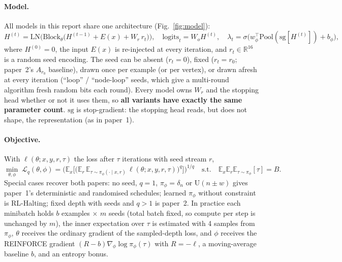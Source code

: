 \documentclass[10pt]{article}
\theoremstyle{definition}
\theoremstyle{remark}
\newcommand{\E}{\mathbb{E}}
\newcommand{\R}{\mathbb{R}}
\newcommand{\pistop}{\pi_\phi}
\newcommand{\Lq}{\mathcal{L}_q}
\begin{document}
\paragraph{Model.}
All models in this report share one architecture (Fig.~\ref{fig:model}):
\begin{equation}
H^{(t)}=\mathrm{LN}\Big(\mathrm{Block}_\theta\big(H^{(t-1)}+E(x)+W_r\,r_t\big)\Big),\quad
\text{logits}_t=W_o H^{(t)},\quad
\lambda_t=\sigma\big(w_\phi^\top \mathrm{Pool}(\mathrm{sg}[H^{(t)}])+b_\phi\big),
\label{eq:model}
\end{equation}
where $H^{(0)}=0$, the input $E(x)$ is re-injected at every iteration, and $r_t\in\R^{16}$
is a random seed encoding.  The seed can be absent ($r_t=0$), fixed ($r_t=r_0$; paper~2's $A_{r_0}$ baseline),
drawn once per example (or per vertex), or drawn afresh at every iteration (``loop'' / ``node-loop'' seeds,
which give a multi-round algorithm fresh random bits each round).  Every model owns $W_r$ and the stopping
head whether or not it uses them, so \textbf{all variants have exactly the same parameter count}.
$\mathrm{sg}$ is stop-gradient: the stopping head reads, but does not shape, the representation (as in paper~1).

\paragraph{Objective.}
With $\ell(\theta;x,y,r,\tau)$ the loss after $\tau$ iterations with seed stream $r$,
\begin{equation}
\min_{\theta,\phi}\;\Lq(\theta,\phi)=\Big(\E_x\big[\big(\E_{r}\,\E_{\tau\sim\pistop(\cdot\mid x,r)}\,\ell(\theta;x,y,r,\tau)\big)^q\big]\Big)^{1/q}
\quad\text{s.t.}\quad \E_x\E_r\E_{\tau\sim\pistop}[\tau]=B .
\label{eq:objective}
\end{equation}
Special cases recover both papers: no seed, $q=1$, $\pistop=\delta_n$ or $\mathrm{U}(n\pm w)$ gives paper~1's
deterministic and randomised schedules; learned $\pistop$ without constraint is RL-Halting; fixed depth with seeds
and $q>1$ is paper~2.  In practice each minibatch holds $b$ examples $\times$ $m$ seeds (total batch fixed, so
compute per step is unchanged by $m$), the inner expectation over $\tau$ is estimated with 4 samples from
$\pistop$, $\theta$ receives the ordinary gradient of the sampled-depth loss, and $\phi$ receives the REINFORCE
gradient $(R-b)\nabla_\phi\log\pistop(\tau)$ with $R=-\ell$, a moving-average baseline $b$, and an entropy bonus.
\end{document}
